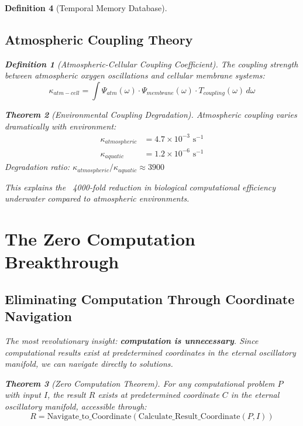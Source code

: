 \documentclass[12pt]{article}
\newtheorem{theorem}{Theorem}[section]
\newtheorem{definition}[theorem]{Definition}
\begin{document}
\begin{definition}[Temporal Memory Database]
\subsection{Atmospheric Coupling Theory}

\begin{definition}[Atmospheric-Cellular Coupling Coefficient]
The coupling strength between atmospheric oxygen oscillations and cellular membrane systems:
\begin{equation}
\kappa_{atm-cell} = \int \Psi_{atm}(\omega) \cdot \Psi_{membrane}(\omega) \cdot T_{coupling}(\omega) \, d\omega
\end{equation}
\end{definition}

\begin{theorem}[Environmental Coupling Degradation]
Atmospheric coupling varies dramatically with environment:
\begin{align}
\kappa_{atmospheric} &= 4.7 \times 10^{-3} \text{ s}^{-1} \\
\kappa_{aquatic} &= 1.2 \times 10^{-6} \text{ s}^{-1}
\end{align}
Degradation ratio: $\kappa_{atmospheric}/\kappa_{aquatic} \approx 3900$
\end{theorem}

This explains the ~4000-fold reduction in biological computational efficiency underwater compared to atmospheric environments.

\section{The Zero Computation Breakthrough}

\subsection{Eliminating Computation Through Coordinate Navigation}

The most revolutionary insight: \textbf{computation is unnecessary}. Since computational results exist at predetermined coordinates in the eternal oscillatory manifold, we can navigate directly to solutions.

\begin{theorem}[Zero Computation Theorem]
For any computational problem $P$ with input $I$, the result $R$ exists at predetermined coordinate $C$ in the eternal oscillatory manifold, accessible through:
\begin{equation}
R = \text{Navigate\_to\_Coordinate}(\text{Calculate\_Result\_Coordinate}(P, I))
\end{equation}
\end{theorem}


\end{definition}
\end{document}
